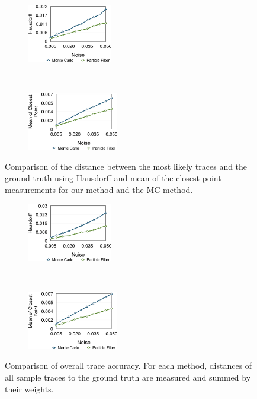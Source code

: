\begin{figure}[!htb]
  \centering
  \begin{subfigure}[b]{0.24\textwidth}
    \centering
    \includegraphics[height=1.0in]{../figures/doublegyre_h.eps}
    \caption{}
  \end{subfigure}~
  \begin{subfigure}[b]{0.24\textwidth}
    \centering
    \includegraphics[height=1.0in]{../figures/doublegyre_m.eps}
    \caption{}
  \end{subfigure}
  \caption{Comparison of the distance between the most likely traces and the ground truth using Hausdorff and mean of the closest point measurements for our method and the MC method.}
  \label{gerror}
\end{figure}

\begin{figure}[!htb]
  \centering
  \begin{subfigure}[b]{0.24\textwidth}
    \centering
    \includegraphics[height=1.0in]{../figures/doublegyre_hr.eps}
    \caption{}
  \end{subfigure}~
  \begin{subfigure}[b]{0.24\textwidth}
    \centering
    \includegraphics[height=1.0in]{../figures/doublegyre_mr.eps}
    \caption{}
  \end{subfigure}
  \caption{Comparison of overall trace accuracy. For each method, distances of all sample traces to the ground truth are measured and summed by their weights.}
  \label{gerror_r}
\end{figure}

